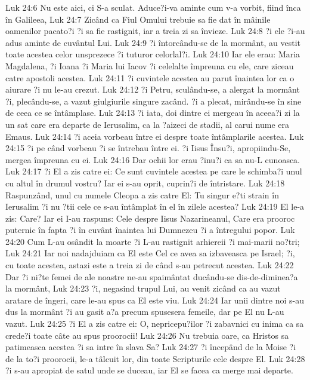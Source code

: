 Luk 24:6  Nu este aici, ci S-a sculat. Aduce?i-va aminte cum v-a vorbit, fiind înca în Galileea,
Luk 24:7  Zicând ca Fiul Omului trebuie sa fie dat în mâinile oamenilor pacato?i ?i sa fie rastignit, iar a treia zi sa învieze.
Luk 24:8  ?i ele ?i-au adus aminte de cuvântul Lui.
Luk 24:9  ?i întorcându-se de la mormânt, au vestit toate acestea celor unsprezece ?i tuturor celorlal?i.
Luk 24:10  Iar ele erau: Maria Magdalena, ?i Ioana ?i Maria lui Iacov ?i celelalte împreuna cu ele, care ziceau catre apostoli acestea.
Luk 24:11  ?i cuvintele acestea au parut înaintea lor ca o aiurare ?i nu le-au crezut.
Luk 24:12  ?i Petru, sculându-se, a alergat la mormânt ?i, plecându-se, a vazut giulgiurile singure zacând. ?i a plecat, mirându-se în sine de ceea ce se întâmplase.
Luk 24:13  ?i iata, doi dintre ei mergeau în aceea?i zi la un sat care era departe de Ierusalim, ca la ?aizeci de stadii, al carui nume era Emaus.
Luk 24:14  ?i aceia vorbeau între ei despre toate întâmplarile acestea.
Luk 24:15  ?i pe când vorbeau ?i se întrebau între ei. ?i Iisus Însu?i, apropiindu-Se, mergea împreuna cu ei.
Luk 24:16  Dar ochii lor erau ?inu?i ca sa nu-L cunoasca.
Luk 24:17  ?i El a zis catre ei: Ce sunt cuvintele acestea pe care le schimba?i unul cu altul în drumul vostru? Iar ei s-au oprit, cuprin?i de întristare.
Luk 24:18  Raspunzând, unul cu numele Cleopa a zis catre El: Tu singur e?ti strain în Ierusalim ?i nu ?tii cele ce s-au întâmplat în el în zilele acestea?
Luk 24:19  El le-a zis: Care? Iar ei I-au raspuns: Cele despre Iisus Nazarineanul, Care era prooroc puternic în fapta ?i în cuvânt înaintea lui Dumnezeu ?i a întregului popor.
Luk 24:20  Cum L-au osândit la moarte ?i L-au rastignit arhiereii ?i mai-marii no?tri;
Luk 24:21  Iar noi nadajduiam ca El este Cel ce avea sa izbaveasca pe Israel; ?i, cu toate acestea, astazi este a treia zi de când s-au petrecut acestea.
Luk 24:22  Dar ?i ni?te femei de ale noastre ne-au spaimântat ducându-se dis-de-diminea?a la mormânt,
Luk 24:23  ?i, negasind trupul Lui, au venit zicând ca au vazut aratare de îngeri, care le-au spus ca El este viu.
Luk 24:24  Iar unii dintre noi s-au dus la mormânt ?i au gasit a?a precum spusesera femeile, dar pe El nu L-au vazut.
Luk 24:25  ?i El a zis catre ei: O, nepricepu?ilor ?i zabavnici cu inima ca sa crede?i toate câte au spus proorocii!
Luk 24:26  Nu trebuia oare, ca Hristos sa patimeasca acestea ?i sa intre în slava Sa?
Luk 24:27  ?i începând de la Moise ?i de la to?i proorocii, le-a tâlcuit lor, din toate Scripturile cele despre El.
Luk 24:28  ?i s-au apropiat de satul unde se duceau, iar El se facea ca merge mai departe.
